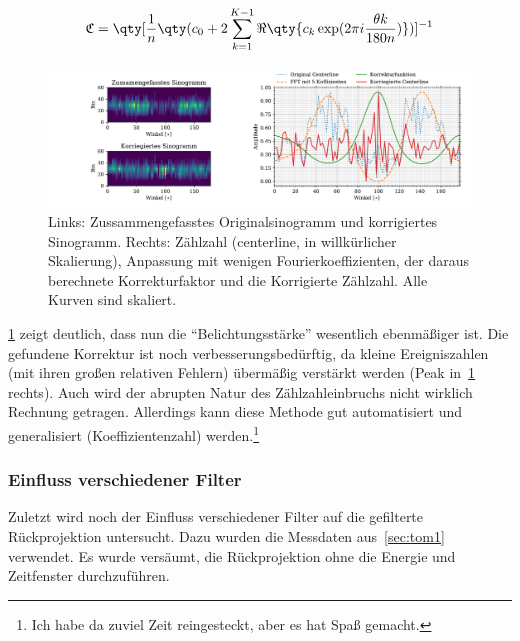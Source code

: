 \documentclass[slug=PET, room=Andreas-Schubert-Bau\,\ 424A, supervisor=Carsten\ Bittrich, coursedate=10.\ 01.\ 2020]{../../Lab_Report_LaTeX/lab_report}
\begin{document}
\begin{equation}
  \label{eq:correction}
  \mathfrak{C} = \qty[\frac{1}{n}
  \qty(c_0 + 2\sum_{k=1}^{K-1}{\Re\qty{c_k\exp(2\pi i \frac{\theta k}{180 n})}})]^{-1}
\end{equation}

\begin{figure}[h]
  \centering
  \includegraphics[width=\textwidth]{../auswertung/figs/tom2/raw_and_corrected.pdf}
  \caption[Sinogramme und Korrekturfunktion]{Links: Zussammengefasstes
    Originalsinogramm und korrigiertes Sinogramm. Rechts: Z\"ahlzahl
    (centerline, in willk\"urlicher Skalierung), Anpassung mit wenigen
  Fourierkoeffizienten, der daraus berechnete Korrekturfaktor und die
  Korrigierte Z\"ahlzahl. Alle Kurven sind skaliert.}
  \label{fig:tom2-raw_and_corrected}
\end{figure}

\ref{fig:tom2-raw_and_corrected} zeigt deutlich, dass nun die
``Belichtungsst\"arke'' wesentlich ebenm\"a\ss{}iger ist. Die
gefundene Korrektur ist noch verbesserungsbed\"urftig, da kleine
Ereigniszahlen (mit ihren gro\ss{}en relativen Fehlern)
\"uberm\"a\ss{}ig verst\"arkt werden (Peak
in~\ref{fig:tom2-raw_and_corrected} rechts). Auch wird der abrupten
Natur des Z\"ahlzahleinbruchs nicht wirklich Rechnung
getragen. Allerdings kann diese Methode gut automatisiert und
generalisiert (Koeffizientenzahl) werden.\footnote{Ich habe da zuviel
  Zeit reingesteckt, aber es hat Spa\ss{} gemacht.}

\subsubsection{Einfluss verschiedener Filter}
\label{sec:filter}

Zuletzt wird noch der Einfluss verschiedener Filter auf die gefilterte Rückprojektion
untersucht. Dazu wurden die Messdaten aus~\ref{sec:tom1} verwendet. Es
wurde vers\"aumt, die R\"uckprojektion ohne die Energie und Zeitfenster
durchzuf\"uhren.
\end{document}

